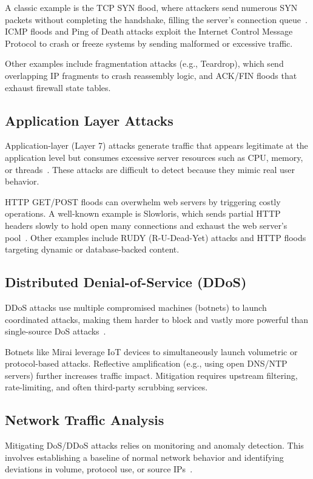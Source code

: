 \documentclass[12pt]{report}
\begin{document}
A classic example is the TCP SYN flood, where attackers send numerous SYN packets without completing the handshake, filling the server’s connection queue~\cite{imperva_dos}. ICMP floods and Ping of Death attacks exploit the Internet Control Message Protocol to crash or freeze systems by sending malformed or excessive traffic.

Other examples include fragmentation attacks (e.g., Teardrop), which send overlapping IP fragments to crash reassembly logic, and ACK/FIN floods that exhaust firewall state tables.

\subsection{Application Layer Attacks}
Application-layer (Layer 7) attacks generate traffic that appears legitimate at the application level but consumes excessive server resources such as CPU, memory, or threads~\cite{fidelis_dos}. These attacks are difficult to detect because they mimic real user behavior.

HTTP GET/POST floods can overwhelm web servers by triggering costly operations. A well-known example is Slowloris, which sends partial HTTP headers slowly to hold open many connections and exhaust the web server’s pool~\cite{netscout_slowloris}. Other examples include RUDY (R-U-Dead-Yet) attacks and HTTP floods targeting dynamic or database-backed content.

\subsection{Distributed Denial-of-Service (DDoS)}
DDoS attacks use multiple compromised machines (botnets) to launch coordinated attacks, making them harder to block and vastly more powerful than single-source DoS attacks~\cite{fidelis_dos}.

Botnets like Mirai leverage IoT devices to simultaneously launch volumetric or protocol-based attacks. Reflective amplification (e.g., using open DNS/NTP servers) further increases traffic impact. Mitigation requires upstream filtering, rate-limiting, and often third-party scrubbing services.

\subsection{Network Traffic Analysis}
Mitigating DoS/DDoS attacks relies on monitoring and anomaly detection. This involves establishing a baseline of normal network behavior and identifying deviations in volume, protocol use, or source IPs~\cite{fidelis_dos, mdpi_dos}.
\end{document}
